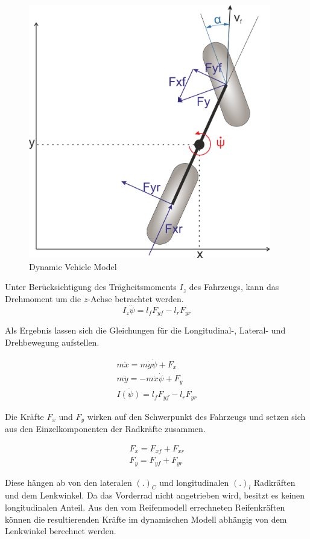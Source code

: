 \documentclass{like}
\begin{document}
\begin{figure}[ht!]
	\centering
	\includegraphics[width=300pt]{Abbildungen/dynBicycle.png}
	\caption{Dynamic Vehicle Model}
	\label{fig:dynModel}
\end{figure}

Unter Berücksichtigung des Trägheitsmoments \(I_z\) des Fahrzeugs, kann das Drehmoment um die \(z\)-Achse betrachtet werden.
\begin{equation}
I_z \ddot{\psi} = l_f F_{yf} - l_r F_{yr}
\end{equation}

Als Ergebnis lassen sich die Gleichungen für die Longitudinal-, Lateral- und Drehbewegung aufstellen.

\begin{eqnarray}
m \ddot{x} = m \dot{y} \dot{\psi} + F_x \\
m \ddot{y} = - m \dot{x} \dot{\psi} + F_y \\
I \ddot{(\psi)} = l_f F_{yf} - l_r F_{yr}
\end{eqnarray}

Die Kräfte \(F_{x}\) und \(F_{y}\) wirken auf den Schwerpunkt des Fahrzeugs und setzen sich aus den Einzelkomponenten der Radkräfte zusammen.

\begin{eqnarray}
F_x = F_{xf} + F_{xr} \\
F_y = F_{yf} + F_{yr}
\end{eqnarray}

Diese hängen ab von den lateralen \((.)_C\) und longitudinalen \((.)_l\)    Radkräften und dem Lenkwinkel. Da das Vorderrad nicht angetrieben wird, besitzt es keinen longitudinalen Anteil. Aus den vom Reifenmodell errechneten Reifenkräften können die resultierenden Kräfte im dynamischen Modell abhängig von dem Lenkwinkel berechnet werden.
\end{document}
